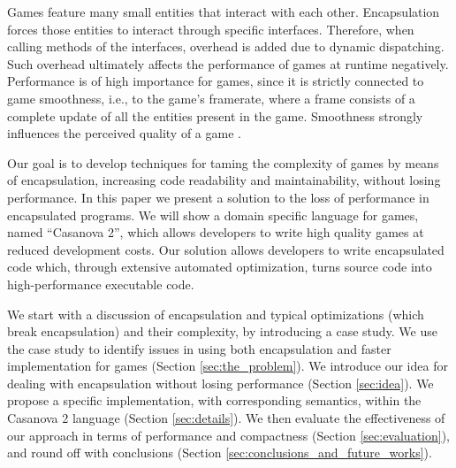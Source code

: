 Games feature many small entities that interact with each other. Encapsulation forces those entities to interact through specific interfaces. Therefore, when calling methods of the interfaces, overhead is added due to dynamic dispatching. Such overhead ultimately affects the performance of games at runtime negatively. Performance is of high importance for games, since it is strictly connected to game smoothness, i.e., to the game's framerate, where a frame consists of a complete update of all the entities present in the game. Smoothness strongly influences the perceived quality of a game \cite{claypool2009perspectives}.

Our goal is to develop techniques for taming the complexity of games by means of encapsulation, increasing code readability and maintainability, without losing performance.
In this paper we present a solution to the loss of performance in encapsulated programs. We will show a domain specific language for games, named ``Casanova 2'', which allows developers to write high quality games at reduced development costs. Our solution allows developers to write encapsulated code which, through extensive automated optimization, turns source code into high-performance executable code.


We start with a discussion of encapsulation and typical optimizations (which break encapsulation) and their complexity, by introducing a case study. We use the case study to identify issues in using both encapsulation and faster implementation for games (Section \ref{sec:the_problem}). We introduce our idea for dealing with encapsulation without losing performance (Section \ref{sec:idea}). We propose a specific implementation, with corresponding semantics, within the Casanova 2 language (Section \ref{sec:details}). We then evaluate the effectiveness of our approach in terms of performance and compactness (Section \ref{sec:evaluation}), and round off with conclusions (Section \ref{sec:conclusions_and_future_works}). 